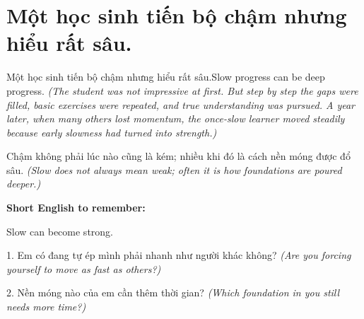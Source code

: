 \section{Một học sinh tiến bộ chậm nhưng hiểu rất sâu.}
\begin{truyen}{Một học sinh tiến bộ chậm nhưng hiểu rất sâu.}{Slow progress can be deep progress.}
\textit{(The student was not impressive at first. But step by step the gaps were filled, basic exercises were repeated, and true understanding was pursued. A year later, when many others lost momentum, the once-slow learner moved steadily because early slowness had turned into strength.)}
\end{truyen}
\begin{baihoc}
Chậm không phải lúc nào cũng là kém; nhiều khi đó là cách nền móng được đổ sâu.
\textit{(Slow does not always mean weak; often it is how foundations are poured deeper.)}
\end{baihoc}
\begin{ghinhoanh}
\textbf{Short English to remember:}

Slow can become strong.
\end{ghinhoanh}
\begin{tuhocnhanh}
1. Em có đang tự ép mình phải nhanh như người khác không? \textit{(Are you forcing yourself to move as fast as others?)}

2. Nền móng nào của em cần thêm thời gian? \textit{(Which foundation in you still needs more time?)}
\end{tuhocnhanh}
\ngancach


